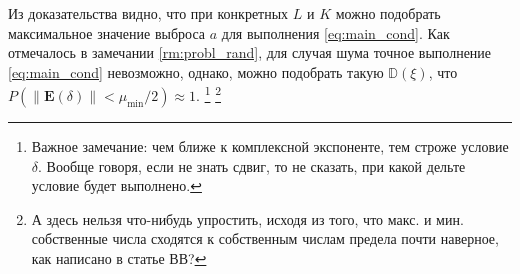 \documentclass[specialist,
               substylefile = spbu.rtx,
               subf,href,colorlinks=true, 12pt]{disser}
\begin{document}
Из доказательства видно, что при конкретных $L$ и $K$ можно подобрать максимальное значение выброса $a$ для выполнения \eqref{eq:main_cond}. Как отмечалось в замечании \ref{rm:probl_rand}, для случая шума точное выполнение \eqref{eq:main_cond} невозможно, однако, можно подобрать такую $\mathbb{D}(\xi)$, что $P(\|\mathbf{E}(\delta)\| < \mu_{\min} / 2) \approx 1$.
\footnote{Важное замечание: чем ближе к комплексной экспоненте, тем строже условие $\delta$. Вообще говоря, если не знать сдвиг, то не сказать, при какой дельте условие будет выполнено.}
\footnote{А здесь нельзя что-нибудь упростить, исходя из того, что макс. и мин. собственные числа сходятся к собственным числам предела почти наверное, как написано в статье ВВ?}
%
%
%
%
%
%
\end{document}
